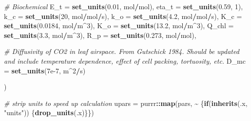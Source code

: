\documentclass[12pt,halfline,a4paper,]{ouparticle}
\newenvironment{Shaded}{\begin{snugshade}}{\end{snugshade}}
\newcommand{\AttributeTok}[1]{\textcolor[rgb]{0.13,0.29,0.53}{#1}}
\newcommand{\CommentTok}[1]{\textcolor[rgb]{0.56,0.35,0.01}{\textit{#1}}}
\newcommand{\ControlFlowTok}[1]{\textcolor[rgb]{0.13,0.29,0.53}{\textbf{#1}}}
\newcommand{\DecValTok}[1]{\textcolor[rgb]{0.00,0.00,0.81}{#1}}
\newcommand{\FloatTok}[1]{\textcolor[rgb]{0.00,0.00,0.81}{#1}}
\newcommand{\FunctionTok}[1]{\textcolor[rgb]{0.13,0.29,0.53}{\textbf{#1}}}
\newcommand{\NormalTok}[1]{#1}
\newcommand{\OtherTok}[1]{\textcolor[rgb]{0.56,0.35,0.01}{#1}}
\newcommand{\SpecialCharTok}[1]{\textcolor[rgb]{0.81,0.36,0.00}{\textbf{#1}}}
\newcommand{\StringTok}[1]{\textcolor[rgb]{0.31,0.60,0.02}{#1}}
\begin{document}
\begin{Shaded}
\begin{Highlighting}[]
    \CommentTok{\# Biochemical}
    \AttributeTok{E\_t =} \FunctionTok{set\_units}\NormalTok{(}\FloatTok{0.01}\NormalTok{, mol}\SpecialCharTok{/}\NormalTok{mol),}
    \AttributeTok{eta\_t =} \FunctionTok{set\_units}\NormalTok{(}\FloatTok{0.59}\NormalTok{, }\DecValTok{1}\NormalTok{),}
    \AttributeTok{k\_c =} \FunctionTok{set\_units}\NormalTok{(}\DecValTok{20}\NormalTok{, mol}\SpecialCharTok{/}\NormalTok{mol}\SpecialCharTok{/}\NormalTok{s),}
    \AttributeTok{k\_o =} \FunctionTok{set\_units}\NormalTok{(}\FloatTok{4.2}\NormalTok{, mol}\SpecialCharTok{/}\NormalTok{mol}\SpecialCharTok{/}\NormalTok{s),}
    \AttributeTok{K\_c =} \FunctionTok{set\_units}\NormalTok{(}\FloatTok{0.0184}\NormalTok{, mol}\SpecialCharTok{/}\NormalTok{m}\SpecialCharTok{\^{}}\DecValTok{3}\NormalTok{),}
    \AttributeTok{K\_o =} \FunctionTok{set\_units}\NormalTok{(}\FloatTok{13.2}\NormalTok{, mol}\SpecialCharTok{/}\NormalTok{m}\SpecialCharTok{\^{}}\DecValTok{3}\NormalTok{),}
    \AttributeTok{Q\_chl =} \FunctionTok{set\_units}\NormalTok{(}\FloatTok{3.3}\NormalTok{, mol}\SpecialCharTok{/}\NormalTok{m}\SpecialCharTok{\^{}}\DecValTok{3}\NormalTok{),}
    \AttributeTok{R\_p =} \FunctionTok{set\_units}\NormalTok{(}\FloatTok{0.273}\NormalTok{, mol}\SpecialCharTok{/}\NormalTok{mol),}

    \CommentTok{\# Diffusivity of CO2 in leaf airspace. From Gutschick 1984. Should be updated and include temperature dependence, effect of cell packing, tortuosity, etc.}
    \AttributeTok{D\_mc =} \FunctionTok{set\_units}\NormalTok{(}\FloatTok{7e{-}7}\NormalTok{, m}\SpecialCharTok{\^{}}\DecValTok{2}\SpecialCharTok{/}\NormalTok{s)}

\NormalTok{)}

\CommentTok{\# strip units to speed up calculation}
\NormalTok{upars }\OtherTok{=}\NormalTok{ purrr}\SpecialCharTok{::}\FunctionTok{map}\NormalTok{(pars, }\SpecialCharTok{\textasciitilde{}}\NormalTok{ \{}\ControlFlowTok{if}\NormalTok{(}\FunctionTok{inherits}\NormalTok{(.x, }\StringTok{"units"}\NormalTok{)) \{}\FunctionTok{drop\_units}\NormalTok{(.x)\}\})}


\end{Highlighting}
\end{Shaded}
\end{document}
